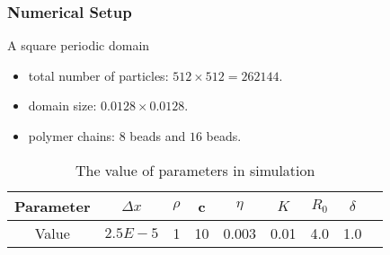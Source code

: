 \begin{frame}
\frametitle{Numerical Setup} 
\begin{block}{A square periodic domain}
 \begin{itemize}
  \item total number of particles: $512 \times 512 = 262144$.
  \item domain size: $ 0.0128\times 0.0128$.
  \item polymer chains: $8$ beads and $16$ beads.
 \end{itemize}
\begin{table}
\begin{center}
  \begin{tabular}{| c | c | c |  c| c | c | c | c | c |}
    \hline
    Parameter & $\Delta x$ & $\rho$ & c & $\eta$ & $K$ & $R_0$ & $\delta$ \\ 
    \hline
    Value & $2.5E-5$ & 1 & 10 & 0.003 & 0.01 & 4.0 & 1.0 \\ 
   \hline
  \end{tabular}
\end{center}
\caption {The value of parameters in simulation}
\label{tab:roll}
\end{table}
\end{block}
\end{frame}



